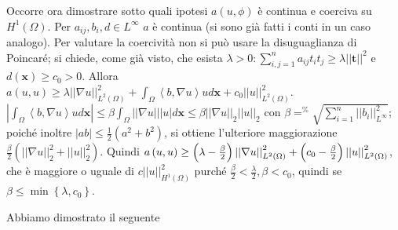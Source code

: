 \documentclass{article}
\begin{document}
Occorre ora dimostrare sotto quali ipotesi $a\left( u,\phi \right) $ \`{e}
continua e coerciva su $H^{1}\left( \Omega \right) $. Per $a_{ij},b_{i},d\in
L^{\infty }$ $a$ \`{e} continua (si sono gi\`{a} fatti i conti in un caso
analogo). Per valutare la coercivit\`{a} non si pu\`{o} usare la
disuguaglianza di Poincar\'{e}; si chiede, come gi\`{a} visto, che esista $%
\lambda >0:\sum_{i,j=1}^{n}a_{ij}t_{i}t_{j}\geq \lambda \left\vert
\left\vert \mathbf{t}\right\vert \right\vert ^{2}$ e $d\left( \mathbf{x}%
\right) \geq c_{0}>0$. Allora $a\left( u,u\right) \geq \lambda \left\vert
\left\vert \nabla u\right\vert \right\vert _{L^{2}\left( \Omega \right)
}^{2}+\int_{\Omega }\left\langle b,\nabla u\right\rangle ud\mathbf{x}%
+c_{0}\left\vert \left\vert u\right\vert \right\vert _{L^{2}\left( \Omega
\right) }^{2}$. $\left\vert \int_{\Omega }\left\langle b,\nabla
u\right\rangle ud\mathbf{x}\right\vert \leq \beta \int_{\Omega }\left\vert
\left\vert \nabla u\right\vert \right\vert \left\vert u\right\vert d\mathbf{x%
}\leq \beta \left\vert \left\vert \nabla u\right\vert \right\vert
_{2}\left\vert \left\vert u\right\vert \right\vert _{2}$ con $\beta =^{\text{%
}}\sqrt{\sum_{i=1}^{n}\left\vert \left\vert b_{i}\right\vert \right\vert
_{L^{\infty }}^{2}}$; poich\'{e} inoltre $\left\vert ab\right\vert \leq 
\frac{1}{2}\left( a^{2}+b^{2}\right) $, si ottiene l'ulteriore maggiorazione 
$\frac{\beta }{2}\left( \left\vert \left\vert \nabla u\right\vert
\right\vert _{2}^{2}+\left\vert \left\vert u\right\vert \right\vert
_{2}^{2}\right) $. Quindi $a\left( u,u\right) \geq \left( \lambda -\frac{%
\beta }{2}\right) \left\vert \left\vert \nabla u\right\vert \right\vert
_{L^{2}\left( \Omega \right) }^{2}+\left( c_{0}-\frac{\beta }{2}\right)
\left\vert \left\vert u\right\vert \right\vert _{L^{2}\left( \Omega \right)
}^{2}$, che \`{e} maggiore o uguale di $c\left\vert \left\vert u\right\vert
\right\vert _{H^{1}\left( \Omega \right) }^{2}$ purch\'{e} $\frac{\beta }{2}<%
\frac{\lambda }{2},\beta <c_{0}$, quindi se $\beta \leq \min \left\{ \lambda
,c_{0}\right\} $.

Abbiamo dimostrato il seguente
\end{document}
